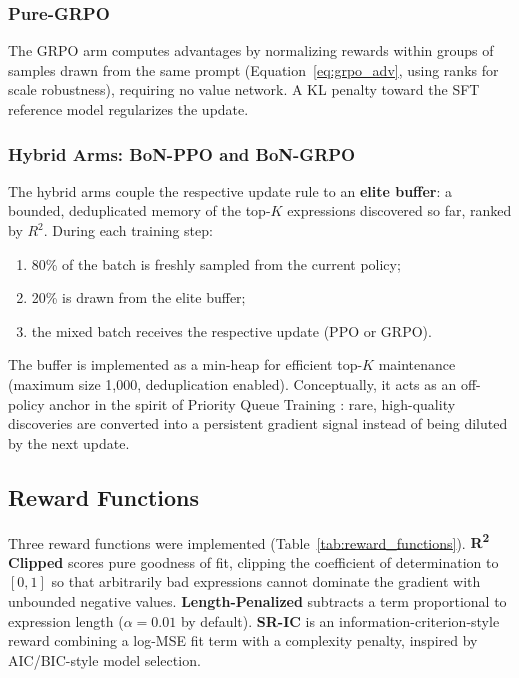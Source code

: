 \subsubsection{Pure-GRPO}

The GRPO arm computes advantages by normalizing rewards within groups of samples drawn from the same prompt (Equation~\ref{eq:grpo_adv}, using ranks for scale robustness), requiring no value network. A KL penalty toward the SFT reference model regularizes the update.

\subsubsection{Hybrid Arms: BoN-PPO and BoN-GRPO}

The hybrid arms couple the respective update rule to an \textbf{elite buffer}: a bounded, deduplicated memory of the top-$K$ expressions discovered so far, ranked by $R^2$. During each training step:
\begin{enumerate}
    \item 80\% of the batch is freshly sampled from the current policy;
    \item 20\% is drawn from the elite buffer;
    \item the mixed batch receives the respective update (PPO or GRPO).
\end{enumerate}
The buffer is implemented as a min-heap for efficient top-$K$ maintenance (maximum size 1{,}000, deduplication enabled). Conceptually, it acts as an off-policy anchor in the spirit of Priority Queue Training \cite{petersen2020deep}: rare, high-quality discoveries are converted into a persistent gradient signal instead of being diluted by the next update.

\subsection{Reward Functions}
\label{sec:reward_functions}

Three reward functions were implemented (Table~\ref{tab:reward_functions}). \textbf{R\textsuperscript{2} Clipped} scores pure goodness of fit, clipping the coefficient of determination to $[0,1]$ so that arbitrarily bad expressions cannot dominate the gradient with unbounded negative values. \textbf{Length-Penalized} subtracts a term proportional to expression length ($\alpha = 0.01$ by default). \textbf{SR-IC} is an information-criterion-style reward combining a log-MSE fit term with a complexity penalty, inspired by AIC/BIC-style model selection.

